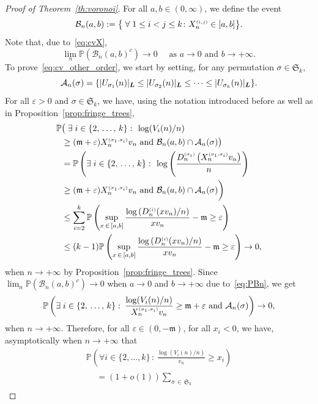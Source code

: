 \documentclass[10pt]{amsart}
\theoremstyle{definition}\newtheorem{defi}[theo]{Definition}\newtheorem{rema}[theo]{Remark}\newtheorem{exam}[theo]{Example}\newtheorem{exem}[theo]{Example}\newtheorem{nota}[theo]{Notation}
\newcommand{\bs}{\ensuremath{\boldsymbol}}
\newcommand{\sss}{\ensuremath{\scriptscriptstyle}}
\newcommand{\bbP}{\mathbb{P}}
\newcommand{\clA}{\mathcal{A}}
\newcommand{\clB}{\mathcal{B}}
\newcommand{\frkm}{\mathfrak{m}}
\newcommand{\frkS}{\mathfrak{S}}
\let\oldexists\exists
\renewcommand*{\exists}{\mathrel{\oldexists}}
\let\oldforall\forall
\renewcommand*{\forall}{\mathrel{\oldforall}}
\begin{document}
\begin{proof}[Proof of Theorem~\ref{th:voronoi}]
For all $a, b\in (0,\infty)$, we define the event
\[
\clB_n(a,b) := \big\{\forall 1\leq i<j\leq k\colon X_n^{\sss (i,j)}\in [a,b]\big\}.
\]
Note that, due to~\eqref{eq:cvX},
\begin{equation}\label{eq:PBn}
\lim_n \bbP(\clB_n(a,b)^c) \to 0 \quad \text{ as }a\to0 \text{ and }b\to+\infty.
\end{equation}
To prove~\eqref{eq:cv_other_order}, we start by setting, for any permutation $\sigma\in\frkS_k$,
\[
\clA_n(\sigma) = \{|U_{\sigma_1}(n)|_{\bs L}\leq |U_{\sigma_2}(n)|_{\bs L}\leq \cdots\leq |U_{\sigma_k}(n)|_{\bs L}\}.
\]
For all $\varepsilon>0$ and $\sigma\in\frkS_k$, we have, using the notation introduced before as well as in Proposition~\ref{prop:fringe_trees},
\begin{align}
\label{eq:distrEst}
\bbP &\big(\exists i \in \{2, \,\ldots,\, k\} \, \colon\,
\log (V_i(n)/n)\\
&\geq (\frkm+\varepsilon) X_n^{\sss (\sigma_1,\sigma_i)} v_n
\text{ and }\clB_n(a,b) \cap \clA_n(\sigma)\big)\nonumber
\\
 &=\bbP\left(\exists i \in \{2,\,\ldots,\,k\} \, \colon\,
\log \left(\frac{D_n^{\sss (\sigma_i)}\left({X^{\sss (\sigma_1, \sigma_i)}_n} v_n \right)}n\right)\right.\nonumber\\
&\geq (\frkm+\varepsilon) X_n^{\sss (\sigma_1,\sigma_i)}v_n
\text{ and }\clB_n(a,b)\cap \clA_n(\sigma)\bigg)\nonumber
\\
&\leq \sum_{i=2}^k\bbP\left(\sup_{x\,\in\,[a,b]} \frac{\log \left(D_n^{\sss (i)}(xv_n)/n\right)}{xv_n}-\frkm\geq \varepsilon\right)\nonumber\\
&
\leq (k-1)\bbP\left(\sup_{x\,\in\,[a,b]} \frac{\log \left(D_n^{\sss (i)}(xv_n)/n\right)}{xv_n}-\frkm\geq \varepsilon\right)\to 0,\nonumber
\end{align}
when $n\to+\infty$ by Proposition~\ref{prop:fringe_trees}. Since $\lim_n \bbP(\clB_n(a,b)^c) \to 0$ when $a\to0$ and $b\to+\infty$ due to~\eqref{eq:PBn}, we get
\[
\bbP\left(\exists i \in \{2,\, \ldots,\, k\} \, \colon\, \frac{\log (V_i(n)/n)}{X_n^{\sss (\sigma_1,\sigma_i)}v_n}\geq \frkm+\varepsilon \text{ and } \clA_n(\sigma)\right)\to 0,
\]
when $n\to+\infty$. Therefore, for all $\varepsilon\in(0, -\frkm)$, for all $x_i<0$, we have, asymptotically when $n\to+\infty$ that
\begin{multline*}
\bbP\left(\forall i \in \{2, \ldots, k\} \, \colon\, \frac{\log (V_i(n)/n)}{v_n}\geq x_i\right)\\
\begin{aligned}
&=(1+o(1))\sum_{\sigma\,\in\,\frkS_k}

\end{aligned}
\end{multline*}
\end{proof}
\end{document}
